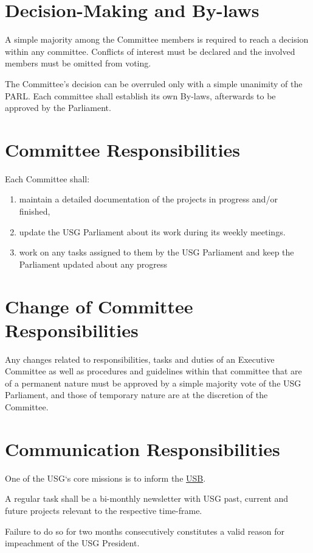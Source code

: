 	\section{Decision-Making and By-laws} 
	A simple majority among the Committee members is required to reach a decision within any committee. Conflicts of interest must be declared and the involved members must be omitted from voting. 


	The Committee's decision can be overruled only with a simple unanimity of the \acl{PARL}. Each committee shall establish its own By-laws, afterwards to be approved by the Parliament.
	\protect\section{Committee Responsibilities}
		Each Committee shall:
		\protect\begin{enumerate}
			\item maintain a detailed documentation of the projects in progress and/or finished,
			\item update the USG Parliament about its work during its weekly meetings.
			\protect\protect\item work on any tasks assigned to them by the USG Parliament and keep the Parliament updated about any progress
	\end{enumerate}

\protect\section{Change of Committee Responsibilities}
		Any changes related to responsibilities, tasks and duties of an Executive Committee as well as procedures and guidelines within that committee that are of a permanent nature must be approved by a simple majority vote of the USG Parliament, and those of temporary nature are at the discretion of the Committee.

	
	\protect\section{Communication Responsibilities}
	One of the USG`s core missions is to inform the \hyperref[studentbody]{USB}. 
	\protect\begin{parenum}
		\item A regular task shall be a bi-monthly newsletter with USG past, current and future projects relevant to the respective time-frame.
		\item Failure to do so for two months consecutively constitutes a valid reason for impeachment of the USG President.
	\end{parenum}

